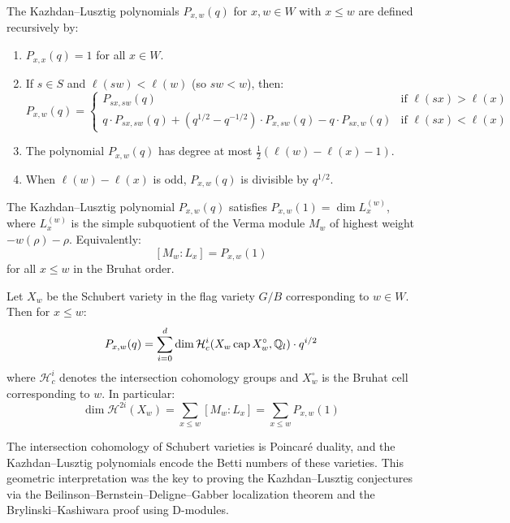 \begin{definition}
The Kazhdan--Lusztig polynomials $P_{x,w}(q)$ for $x, w \in W$ with $x \leq w$ are defined recursively by:
\begin{enumerate}
    \item $P_{x,x}(q) = 1$ for all $x \in W$.
    \item If $s \in S$ and $\ell(sw) < \ell(w)$ (so $sw < w$), then:
    \[
    P_{x,w}(q) = \begin{cases}
    P_{sx, sw}(q) & \text{if } \ell(sx) > \ell(x) \\
    q \cdot P_{sx, sw}(q) + (q^{1/2} - q^{-1/2}) \cdot P_{x, sw}(q) - q \cdot P_{sx, w}(q) & \text{if } \ell(sx) < \ell(x)
    \end{cases}
    \]
    \item The polynomial $P_{x,w}(q)$ has degree at most $\frac{1}{2}(\ell(w) - \ell(x) - 1)$.
    \item When $\ell(w) - \ell(x)$ is odd, $P_{x,w}(q)$ is divisible by $q^{1/2}$.
\end{enumerate}
\end{definition}

\begin{theorem}
The Kazhdan--Lusztig polynomial $P_{x,w}(q)$ satisfies $P_{x,w}(1) = \dim L_x^{(w)}$, where $L_x^{(w)}$ is the simple subquotient of the Verma module $M_w$ of highest weight $-w(\rho) - \rho$. Equivalently:
\[
[M_w: L_x] = P_{x,w}(1)
\]
for all $x \leq w$ in the Bruhat order.
\end{theorem}

\begin{theorem}
Let $X_w$ be the Schubert variety in the flag variety $G/B$ corresponding to $w \in W$. Then for $x \leq w$:
\[
P_{x,w}(q) = \sum_{i=0}^{d} \dim \mathcal{H}^i_{c}(X_w \operatorname{\mathrm{cap}} X_w^{\circ}, \mathbb{Q}_l) \cdot q^{i/2}
\]
where $\mathcal{H}^i_c$ denotes the intersection cohomology groups and $X_w^{\circ}$ is the Bruhat cell corresponding to $w$. In particular:
\[
\dim \mathcal{H}^{2i}(X_w) = \sum_{x \leq w} [M_w: L_x] = \sum_{x \leq w} P_{x,w}(1)
\]
\end{theorem}

\begin{remark}
The intersection cohomology of Schubert varieties is Poincar\'e duality, and the Kazhdan--Lusztig polynomials encode the Betti numbers of these varieties. This geometric interpretation was the key to proving the Kazhdan--Lusztig conjectures via the Beilinson--Bernstein--Deligne--Gabber localization theorem and the Brylinski--Kashiwara proof using D-modules.
\end{remark}


